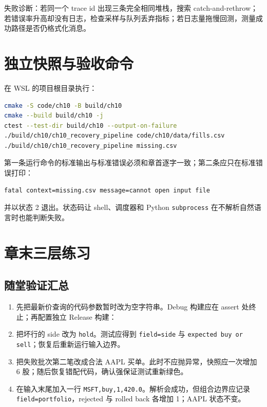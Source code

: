 失败诊断：若同一个 trace id 出现三条完全相同堆栈，搜索 catch-and-rethrow；若错误率升高却没有日志，检查采样与队列丢弃指标；若日志量拖慢回测，测量成功路径是否仍格式化消息。

\section{独立快照与验收命令}



在 WSL 的项目根目录执行：

\begin{lstlisting}[language=bash]
cmake -S code/ch10 -B build/ch10
cmake --build build/ch10 -j
ctest --test-dir build/ch10 --output-on-failure
./build/ch10/ch10_recovery_pipeline code/ch10/data/fills.csv
./build/ch10/ch10_recovery_pipeline missing.csv
\end{lstlisting}

第一条运行命令的标准输出与标准错误必须和章首逐字一致；第二条应只在标准错误打印：

\begin{lstlisting}
fatal context=missing.csv message=cannot open input file
\end{lstlisting}

并以状态 2 退出。状态码让 shell、调度器和 Python \texttt{subprocess} 在不解析自然语言时也能判断失败。

\section{章末三层练习}

\subsection*{随堂验证汇总}

\begin{enumerate}
  \item 先把最新价查询的代码参数暂时改为空字符串。Debug 构建应在 assert 处终止；再配置独立 Release 构建：
  \item 把坏行的 side 改为 \texttt{hold}。测试应得到 \texttt{field=side} 与 \texttt{expected buy or sell}；恢复后重新运行输入边界。
  \item 把失败批次第二笔改成合法 AAPL 买单。此时不应抛异常，快照应一次增加 6 股；随后恢复错配代码，确认强保证测试重新绿色。
  \item 在输入末尾加入一行 \texttt{MSFT,buy,1,420.0}。解析会成功，但组合边界应记录 \texttt{field=portfolio}，rejected 与 rolled back 各增加 1；AAPL 状态不变。
\end{enumerate}

